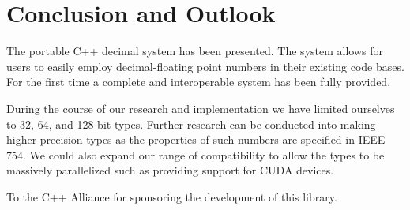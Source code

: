 \documentclass[acmsmall]{acmart}
\begin{document}
\section{Conclusion and Outlook}

The portable C++ decimal system has been presented.
The system allows for users to easily employ decimal-floating point numbers in their existing code bases.
For the first time a complete and interoperable system has been fully provided.

During the course of our research and implementation we have limited ourselves to 32, 64, and 128-bit types.
Further research can be conducted into making higher precision types as the properties of such numbers are specified in IEEE 754.
We could also expand our range of compatibility to allow the types to be massively parallelized such as providing support for CUDA devices.

\begin{acks}
To the C++ Alliance for sponsoring the development of this library. 
\end{acks}


\nocite{*}

\end{document}
